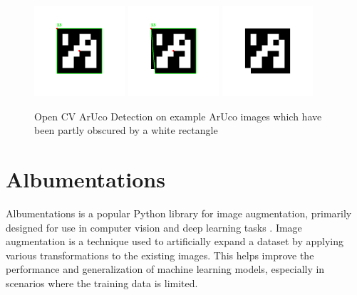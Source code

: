 \documentclass[10pt]{book}
\begin{document}
\begin{figure}
  \centering
     {\includegraphics[width=0.3\textwidth]{image/rec}}
     {\includegraphics[width=0.3\textwidth]{image/skewed-rec}}
     {\includegraphics[width=0.3\textwidth]{image/no-rec}}
  \caption{Open CV ArUco Detection on example \ac{ArUco} images which have been partly obscured by a white rectangle}
  \label{fig:aruco-det}
\end{figure}

\section{Albumentations}

Albumentations is a popular Python library for image augmentation, primarily designed for use in computer vision and deep learning tasks \cite{info11020125}. Image augmentation is a technique used to artificially expand a dataset by applying various transformations to the existing images. This helps improve the performance and generalization of machine learning models, especially in scenarios where the training data is limited.
\end{document}
